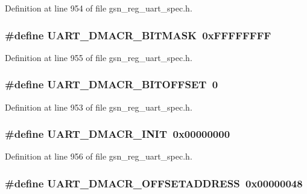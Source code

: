 Definition at line 954 of file gsn\_\-reg\_\-uart\_\-spec.h.

\hypertarget{a00575_a837605ba26727ab18f37ea1db914aa66}{
\subsubsection[{UART\_\-DMACR\_\-BITMASK}]{\setlength{\rightskip}{0pt plus 5cm}\#define UART\_\-DMACR\_\-BITMASK~0xFFFFFFFF}}
\label{a00575_a837605ba26727ab18f37ea1db914aa66}


Definition at line 955 of file gsn\_\-reg\_\-uart\_\-spec.h.

\hypertarget{a00575_a2a63ba635654a1e69b449e1491bbbcca}{
\subsubsection[{UART\_\-DMACR\_\-BITOFFSET}]{\setlength{\rightskip}{0pt plus 5cm}\#define UART\_\-DMACR\_\-BITOFFSET~0}}
\label{a00575_a2a63ba635654a1e69b449e1491bbbcca}


Definition at line 953 of file gsn\_\-reg\_\-uart\_\-spec.h.

\hypertarget{a00575_a3b6d337ed5eec50b25096a7374a4ea72}{
\subsubsection[{UART\_\-DMACR\_\-INIT}]{\setlength{\rightskip}{0pt plus 5cm}\#define UART\_\-DMACR\_\-INIT~0x00000000}}
\label{a00575_a3b6d337ed5eec50b25096a7374a4ea72}


Definition at line 956 of file gsn\_\-reg\_\-uart\_\-spec.h.

\hypertarget{a00575_acb19b7d77fa9715167a7124a99f69f8e}{
\subsubsection[{UART\_\-DMACR\_\-OFFSETADDRESS}]{\setlength{\rightskip}{0pt plus 5cm}\#define UART\_\-DMACR\_\-OFFSETADDRESS~0x00000048}}
\label{a00575_acb19b7d77fa9715167a7124a99f69f8e}


